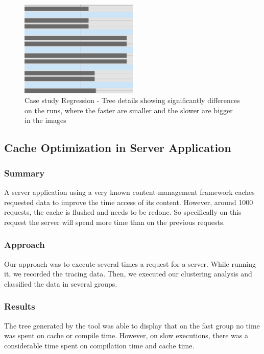     \begin{figure}[h]
          \centering
            \includegraphics[width=0.50\textwidth]{figures/showing_diff.png}
            \caption{Case study Regression - Tree details showing significantly differences on the runs, where the faster are smaller and the slower are bigger in the images}
            \label{fig:case1}
    \end{figure}

    
\subsection{Cache Optimization in Server Application}
    
\subsubsection{Summary}
    A server application using a very known content-management framework caches requested data to improve the time access of its content. However, around 1000 requests, the cache is flushed and needs to be redone. So specifically on this request the server will spend more time than on the previous requests.
    
\subsubsection{Approach}
    Our approach was to execute several times a request for a server. While running it, we recorded the tracing data. Then, we executed our clustering analysis and classified the data in several groups.
    
\subsubsection{Results}
    The tree generated by the tool was able to display that on the fast group no time was spent on cache or compile time. However, on slow executions, there was a considerable time spent on compilation time and cache time.
        
